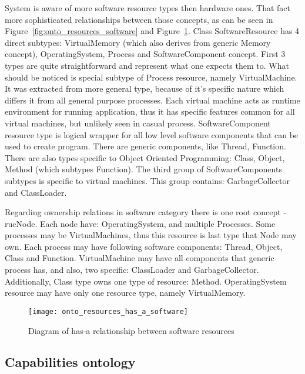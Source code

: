 System is aware of more software resource types then hardware ones. That fact more sophisticated relationships between
those concepts, as can be seen in Figure~\ref{fig:onto_resources_software}
and Figure~\ref{fig:onto_resources_has_a_software}. Class SoftwareResource has 4 direct subtypes: VirtualMemory (which
also derives from generic Memory concept), OperatingSystem, Process and SoftwareComponent concept. First 3 types are
quite straightforward and represent what one expects them to.
What should be noticed is special subtype of Process resource, namely VirtualMachine. It was extracted from more
general type, because of it's specific nature which differs it from all general purpose processes. Each virtual
machine acts as runtime environment for running application, thus it has specific features common for all virtual
machines, but unlikely seen in casual process.
SoftwareComponent resource type is logical wrapper for all low level software components that can be used to create
program. There are generic components, like Thread, Function. There are also types specific to Object Oriented
Programming: Class, Object, Method (which subtypes Function). The third group of SoftwareComponents subtypes is specific
to virtual machines. This group contains: GarbageCollector and ClassLoader.

\pagebreak
Regarding ownership relations in software category there is one root concept - rucNode. Each node have: OperatingSystem,
and multiple Processes. Some processes may be VirtualMachines, thus this resource is last type that Node may own.
Each process may have following software components: Thread, Object, Class and Function. VirtualMachine may have
all components that generic process has, and also, two specific: ClassLoader and GarbageCollector. Additionally, Class
type owns one type of resource: Method. 
OperatingSystem resource may have only one resource type, namely VirtualMemory.


\begin{figure}[ht]
  \centering
  \texttt{[image: onto\_resources\_has\_a\_software]}
  \caption{Diagram of has-a relationship between software resources}
  \label{fig:onto_resources_has_a_software}
\end{figure}

\pagebreak

\subsection{Capabilities ontology}
\label{subsec:arch_knowledge_capabilitie}


